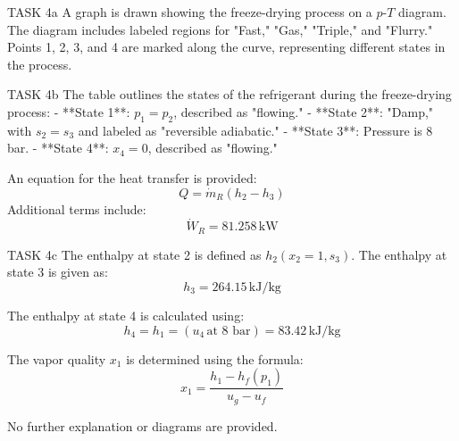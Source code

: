 TASK 4a  
A graph is drawn showing the freeze-drying process on a \( p \)-\( T \) diagram. The diagram includes labeled regions for "Fast," "Gas," "Triple," and "Flurry." Points 1, 2, 3, and 4 are marked along the curve, representing different states in the process.  

TASK 4b  
The table outlines the states of the refrigerant during the freeze-drying process:  
- **State 1**: \( p_1 = p_2 \), described as "flowing."  
- **State 2**: "Damp," with \( s_2 = s_3 \) and labeled as "reversible adiabatic."  
- **State 3**: Pressure is 8 bar.  
- **State 4**: \( x_4 = 0 \), described as "flowing."  

An equation for the heat transfer is provided:  
\[
Q = \dot{m}_R (h_2 - h_3)
\]  
Additional terms include:  
\[
\dot{W}_R = 81.258 \, \text{kW}
\]  

TASK 4c  
The enthalpy at state 2 is defined as \( h_2(x_2 = 1, s_3) \).  
The enthalpy at state 3 is given as:  
\[
h_3 = 264.15 \, \text{kJ/kg}
\]  

The enthalpy at state 4 is calculated using:  
\[
h_4 = h_1 = (u_4 \, \text{at 8 bar}) = 83.42 \, \text{kJ/kg}
\]  

The vapor quality \( x_1 \) is determined using the formula:  
\[
x_1 = \frac{h_1 - h_f(p_1)}{u_g - u_f}
\]  

No further explanation or diagrams are provided.